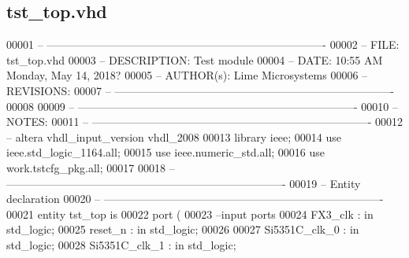 \subsection{tst\+\_\+top.\+vhd}
\label{tst__top_8vhd_source}

\begin{DoxyCode}
00001 \textcolor{keyword}{-- ----------------------------------------------------------------------------}
00002 \textcolor{keyword}{-- FILE:          tst\_top.vhd}
00003 \textcolor{keyword}{-- DESCRIPTION:   Test module}
00004 \textcolor{keyword}{-- DATE:          10:55 AM Monday, May 14, 2018?}
00005 \textcolor{keyword}{-- AUTHOR(s):     Lime Microsystems}
00006 \textcolor{keyword}{-- REVISIONS:}
00007 \textcolor{keyword}{-- ----------------------------------------------------------------------------}
00008 
00009 \textcolor{keyword}{-- ----------------------------------------------------------------------------}
00010 \textcolor{keyword}{--NOTES:}
00011 \textcolor{keyword}{-- ----------------------------------------------------------------------------}
00012 \textcolor{keyword}{-- altera vhdl\_input\_version vhdl\_2008}
00013 \textcolor{vhdlkeyword}{library }\textcolor{keywordflow}{ieee};
00014 \textcolor{vhdlkeyword}{use }ieee.std\_logic\_1164.\textcolor{keywordflow}{all};
00015 \textcolor{vhdlkeyword}{use }ieee.numeric\_std.\textcolor{keywordflow}{all};
00016 \textcolor{vhdlkeyword}{use }work.tstcfg_pkg.\textcolor{keywordflow}{all};
00017 
00018 \textcolor{keyword}{-- ----------------------------------------------------------------------------}
00019 \textcolor{keyword}{-- Entity declaration}
00020 \textcolor{keyword}{-- ----------------------------------------------------------------------------}
00021 \textcolor{keywordflow}{entity }tst_top \textcolor{keywordflow}{is}
00022    \textcolor{keywordflow}{port} \textcolor{vhdlchar}{(}
00023 \textcolor{keyword}{      --input ports }
00024       \textcolor{vhdlchar}{FX3_clk}              \textcolor{vhdlchar}{:} \textcolor{keywordflow}{in} \textcolor{comment}{std\_logic};
00025       \textcolor{vhdlchar}{reset_n}              \textcolor{vhdlchar}{:} \textcolor{keywordflow}{in} \textcolor{comment}{std\_logic};
00026       
00027       \textcolor{vhdlchar}{Si5351C_clk_0}        \textcolor{vhdlchar}{:} \textcolor{keywordflow}{in} \textcolor{comment}{std\_logic};
00028       \textcolor{vhdlchar}{Si5351C_clk_1}        \textcolor{vhdlchar}{:} \textcolor{keywordflow}{in} \textcolor{comment}{std\_logic};

\end{DoxyCode}
